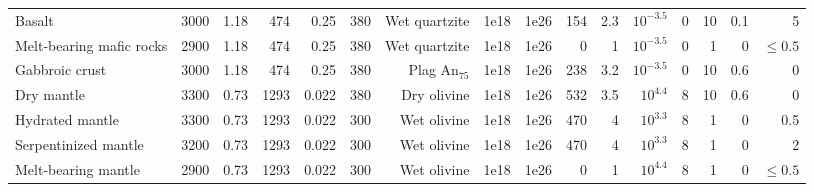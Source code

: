 \documentclass[draft]{assets/agujournal2019}
\begin{document}
\begin{table}
\begin{threeparttable}
\begin{tabularx}{\textwidth}{L{2.75} R{0.5} R{0.5} R{0.5} R{0.5} R{0.5} R{1.5} R{0.5} R{0.5} R{0.5} R{0.5} R{0.75} R{0.75} R{0.75} R{0.5} R{0.75}}
   Basalt                    & 3000             & 1.18                                  & 474   & 0.25                & 380             & Wet quartzite  & 1e18         & 1e26        & 154              & 2.3   & $10^{-3.5}$           & 0                  & 10          & 0.1    & 5          \\

   Melt-bearing mafic rocks  & 2900             & 1.18                                  & 474   & 0.25                & 380             & Wet quartzite  & 1e18         & 1e26        & 0                & 1     & $10^{-3.5}$           & 0                  & 1           & 0      & $\leq 0.5$ \\

   Gabbroic crust            & 3000             & 1.18                                  & 474   & 0.25                & 380             & Plag An$_{75}$ & 1e18         & 1e26        & 238              & 3.2   & $10^{-3.5}$           & 0                  & 10          & 0.6    & 0          \\

   Dry mantle                & 3300             & 0.73                                  & 1293  & 0.022               & 380             & Dry olivine    & 1e18         & 1e26        & 532              & 3.5   & $10^{4.4}$            & 8                  & 10          & 0.6    & 0          \\

   Hydrated mantle           & 3300             & 0.73                                  & 1293  & 0.022               & 300             & Wet olivine    & 1e18         & 1e26        & 470              & 4     & $10^{3.3}$            & 8                  & 1           & 0      & 0.5        \\

   Serpentinized mantle      & 3200             & 0.73                                  & 1293  & 0.022               & 300             & Wet olivine    & 1e18         & 1e26        & 470              & 4     & $10^{3.3}$            & 8                  & 1           & 0      & 2          \\

   Melt-bearing mantle       & 2900             & 0.73                                  & 1293  & 0.022               & 300             & Wet olivine    & 1e18         & 1e26        & 0                & 1     & $10^{4.4}$            & 8                  & 1           & 0      & $\leq 0.5$ \\


\end{tabularx}
\end{threeparttable}
\end{table}
\end{document}
